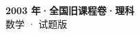 \documentclass[zihao=-4, a4paper]{ctexart}
\begin{document}
\begin{center}
  {\Large\bfseries 2003 年·全国旧课程卷·理科}\\[4pt]
  {\large 数学 · 试题版}
\end{center}
\medskip
{}

\end{document}
